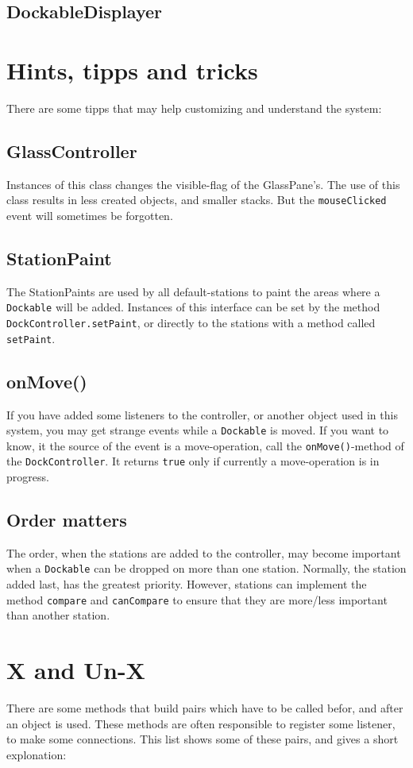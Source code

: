 \documentclass{article}
\begin{document}
\subsection{DockableDisplayer}

\section{Hints, tipps and tricks}
There are some tipps that may help customizing and understand the system:
\subsection{GlassController}
Instances of this class changes the visible-flag of the GlassPane's. The use of this class results in less created objects, and smaller stacks. But the \verb!mouseClicked! event will sometimes be forgotten.
\subsection{StationPaint}
The StationPaints are used by all default-stations to paint the areas where a \verb!Dockable! will be added. Instances of this interface can be set by the method \verb!DockController.setPaint!, or directly to the stations with a method called \verb!setPaint!.
\subsection{onMove()}
If you have added some listeners to the controller, or another object used in this system, you may get strange events while a \verb!Dockable! is moved. If you want to know, it the source of the event is a move-operation, call the \verb!onMove()!-method of the \verb!DockController!. It returns \verb!true! only if currently a move-operation is in progress.
\subsection{Order matters}
The order, when the stations are added to the controller, may become important when a \verb!Dockable! can be dropped on more than one station. Normally, the station added last, has the greatest priority. However, stations can implement the method \verb!compare! and \verb!canCompare! to ensure that they are more/less important than another station.

\section{X and Un-X}
There are some methods that build pairs which have to be called befor, and after an object is used. These methods are often responsible to register some listener, to make some connections. This list shows some of these pairs, and gives a short explonation:
\end{document}

